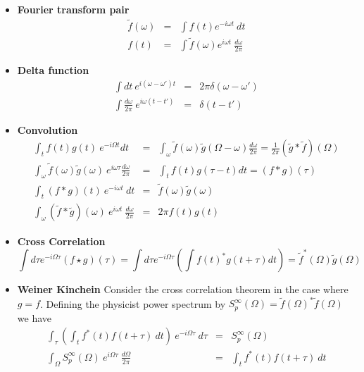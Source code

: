 \documentclass{article}
\begin{document}
\begin{itemize}
\item \textbf{Fourier transform pair} \begin{eqnarray*}
\tilde{f}(\omega) & = & \int f(t)e^{-i\omega t}~dt\\
f(t) & = & \int\tilde{f}(\omega)e^{i\omega t}~\frac{d\omega}{2\pi}\end{eqnarray*}

\item \textbf{Delta function} \begin{eqnarray*}
\int dt~e^{i(\omega-\omega')t} & = & 2\pi\delta(\omega-\omega')\\
\int\frac{d\omega}{2\pi}~e^{i\omega(t-t')} & = & \delta(t-t')\end{eqnarray*}

\item \textbf{Convolution} \begin{eqnarray*}
\int_{t}f(t)g(t)~e^{-i\Omega t}dt & = & \int_{\omega}\tilde{f}(\omega)\tilde{g}(\Omega-\omega)\frac{d\omega}{2\pi}=\frac{1}{2\pi}(\tilde{g}*\tilde{f})(\Omega)\\
\int_{\omega}\tilde{f}(\omega)\tilde{g}(\omega)~e^{i\omega\tau}\frac{d\omega}{2\pi} & = & \int_{t}f(t)g(\tau-t)dt=(f*g)(\tau)\\
\int_{t}(f*g)(t)~e^{-i\omega t}~dt & = & \tilde{f}(\omega)\tilde{g}(\omega)\\
\int_{\omega}(\tilde{f}*\tilde{g})(\omega)~e^{i\omega t}~\frac{d\omega}{2\pi} & = & 2\pi f(t)g(t)\end{eqnarray*}

\item \textbf{Cross Correlation}\begin{equation}
\int d\tau e^{-i\Omega\tau}\left(f\star g\right)(\tau) = \int d\tau e^{-i\Omega\tau}\left(\int f(t)^{*}g(t+\tau)dt\right)=\tilde{f}^{*}(\Omega)\tilde{g}(\Omega) \nonumber \end{equation}

\item \textbf{Weiner Kinchein} Consider the cross correlation theorem in
the case where $g=f$. Defining the physicist power spectrum by $S_{p}^{\infty}(\Omega)=\tilde{f}(\Omega)^{*}\tilde{f}(\Omega)$
we have \begin{eqnarray*}
\int_{\tau}\left(\int_{t}f^{*}(t)f(t+\tau)~dt\right)~e^{-i\Omega\tau}~d\tau & = & S_{p}^{\infty}(\Omega)\\
\int_{\Omega}S_{p}^{\infty}(\Omega)~e^{i\Omega\tau}~\frac{d\Omega}{2\pi} & = & \int_{t}f^{*}(t)f(t+\tau)~dt\end{eqnarray*}
\end{itemize}
\end{document}
